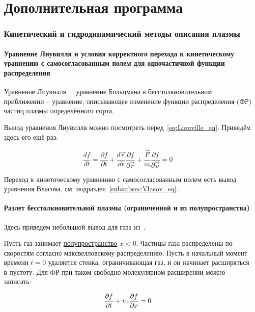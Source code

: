 \documentclass[10pt, a4paper]{article}
\let\stdsection\section
\renewcommand\section{\newpage\stdsection}
\let\stdpart\part
\renewcommand{\part}{\newpage\stdpart}
\begin{document}
\part{Дополнительная программа}

\section{Кинетический и гидродинамический методы описания плазмы}

\subsection{Уравнение Лиувилля и условия корректного перехода к кинетическому уравнению с самосогласованным полем для одночастичной функции распределения}

Уравнение Лиувилля = уравнение Больцмана в бесстолкновительном приближении -- уравнение, описывающее изменение функции распределения (ФР) частиц плазмы определённого сорта.

Вывод уравнения Лиувилля можно посмотреть перед~\eqref{eq:Liouville_eq}. Приведём здесь его ещё раз:

\begin{equation}
	\frac{df}{dt} = \frac{\partial f}{\partial t} + \frac{d\vec{r}}{dt}\frac{\partial f}{\partial \vec{r}}+ \frac{\vec{F}}{m}\frac{\partial f}{\partial \vec{v}} = 0
\end{equation}

Переход к кинетическому уравнению с самосогласованным полем есть вывод уравнения Власова, см. подраздел~\ref{subsubsec:Vlasov_eq}.

\subsection{Разлет бесстолкновительной плазмы (ограниченной и из полупространства)}

Здесь приведём небольшой вывод для газа из~\cite{silin}. 

Пусть газ занимает \uline{полупространство} $x<0$. Частицы газа распределены по скоростям согласно максвелловскому распределению. Пусть в начальный момент времени $t=0$ удаляется стенка, ограничивающая газ, и он начинает расширяться в пустоту. Для ФР при таком свободно-молекулярном расширении можно записать:

\begin{equation*}
	\pdv{f}{t}+v_x\pdv{f}{x} = 0
\end{equation*}
\end{document}
